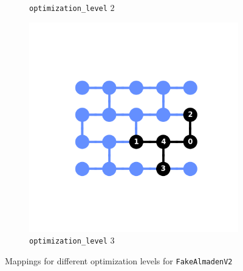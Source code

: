 \documentclass[11pt]{article}
\begin{document}
\begin{figure}[hbtp]
\begin{subfigure}{0.24\linewidth}
        \caption{\texttt{optimization\_level} $2$}
    \end{subfigure}
    \begin{subfigure}{0.24\linewidth}
        \centering
        \includegraphics[width=\linewidth]{outputs/routing_FakeAlmadenV2_3.png}
        \caption{\texttt{optimization\_level} $3$}
    \end{subfigure}
    \caption{Mappings for different optimization levels for \texttt{FakeAlmadenV2}}
    \label{fig:routing_almaden}
\end{figure}
\end{document}

